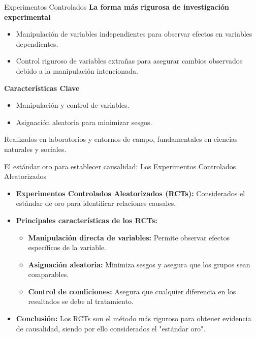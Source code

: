 ﻿\documentclass{beamer}
\begin{document}
\begin{frame}{Experimentos Controlados}
    \textbf{La forma más rigurosa de investigación experimental}
    \begin{itemize}
        \item Manipulación de variables independientes para observar efectos en variables dependientes.
        \item Control riguroso de variables extrañas para asegurar cambios observados debido a la manipulación intencionada.
    \end{itemize}

    \textbf{Características Clave}
    \begin{itemize}
        \item Manipulación y control de variables.
        \item Asignación aleatoria para minimizar sesgos.
    \end{itemize}

    Realizados en laboratorios y entornos de campo, fundamentales en ciencias naturales y sociales.
\end{frame}

\begin{frame}{El estándar oro para establecer causalidad: Los Experimentos Controlados Aleatorizados}
    \begin{itemize}
        \item \textbf{Experimentos Controlados Aleatorizados (RCTs):} Considerados el estándar de oro para identificar relaciones causales.
        \item \textbf{Principales características de los RCTs:}
            \begin{itemize}
                \item \textbf{Manipulación directa de variables:} Permite observar efectos específicos de la variable.
                \item \textbf{Asignación aleatoria:} Minimiza sesgos y asegura que los grupos sean comparables.
                \item \textbf{Control de condiciones:} Asegura que cualquier diferencia en los resultados se debe al tratamiento.
            \end{itemize}
        \item \textbf{Conclusión:} Los RCTs son el método más riguroso para obtener evidencia de causalidad, siendo por ello considerados el "estándar oro".
    \end{itemize}
\end{frame}
\end{document}
